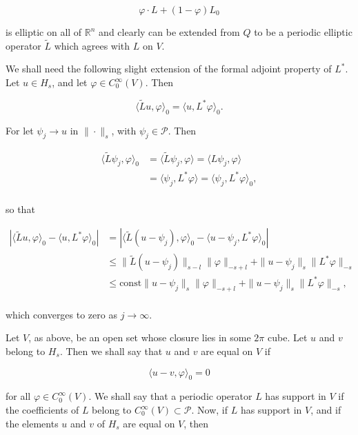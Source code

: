 \begin{remarks}
\[
\varphi\cdot L+(1-\varphi)L_{0}
\]

is elliptic on all of  $ \mathbb{R}^n $ and clearly can be extended from $Q$ to be a periodic elliptic operator $\tilde{L}$ which agrees with $L$ on $V$.

We shall need the following slight extension of the formal adjoint property of  $ L^* $. Let  $ u \in H_s $, and let  $ \varphi \in C_0^\infty(V) $. Then

\begin{equation}
\tag{2}\label{eq:6.31:2}
\langle\tilde{L}u,\varphi\rangle_{0}=\langle u,L^{*}\varphi\rangle_{0}.
\end{equation}

For let $\psi_{j} \to u$ in $\|\cdot\|_{s}$, with  $ \psi_{j} \in \mathcal{P} $. Then

\[
\begin{aligned}{\langle\tilde{L}\psi_{j},\varphi\rangle_{0}}&{{}=\langle\tilde{L}\psi_{j},\varphi\rangle=\langle L\psi_{j},\varphi\rangle}\\ {}&{{}=\langle\psi_{j},L^{*}\varphi\rangle=\langle\psi_{j},L^{*}\varphi\rangle_{0},}\\ \end{aligned}
\]

so that

\[
\begin{aligned}{|\langle\tilde{L}u,\varphi\rangle_{0}-\langle u,L^{*}\varphi\rangle_{0}|}&{{}=|\langle\tilde{L}(u-\psi_{j}),\varphi\rangle_{0}-\langle u-\psi_{j},L^{*}\varphi\rangle_{0}|}\\ {}&{{}\leq\|\tilde{L}(u-\psi_{j})\|_{s-l}\|\varphi\|_{-s+l}+\|u-\psi_{j}\|_{s}\|L^{*}\varphi\|_{-s}}\\ {}&{{}\leq\mathrm{const}\|u-\psi_{j}\|_{s}\|\varphi\|_{-s+l}+\|u-\psi_{j}\|_{s}\|L^{*}\varphi\|_{-s},}\\ \end{aligned}
\]

which converges to zero as  $ j \to \infty $.

Let $V$, as above, be an open set whose closure lies in some $2\pi$ cube. Let $u$ and $v$ belong to $H_{s}$. Then we shall say that $u$ and $v$ are equal on $V$ if

\begin{equation}
\tag{3}\label{eq:6.31:3}
\langle u-v,\varphi\rangle_{0}=0
\end{equation}

for all $\varphi \in C_0^\infty(V)$. We shall say that a periodic operator $L$ has support in $V$ if the coefficients of $L$ belong to $C_0^\infty(V) \subset \mathcal{P}$. Now, if $L$ has support in $V$, and if the elements $u$ and $v$ of $H_s$ are equal on $V$, then


\end{remarks}
